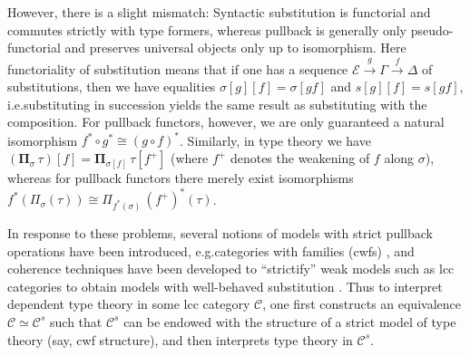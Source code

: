 \documentclass[a4paper]{article}
\theoremstyle{remark}
\theoremstyle{definition}
\begin{document}
However, there is a slight mismatch:
Syntactic substitution is functorial and commutes strictly with type formers, whereas pullback is generally only pseudo-functorial and preserves universal objects only up to isomorphism.
Here functoriality of substitution means that if one has a sequence $\mathcal{E} \xrightarrow{g} \Gamma \xrightarrow{f} \Delta$ of substitutions, then we have equalities $\sigma[g][f] = \sigma[gf]$ and $s[g][f] = s[gf]$, i.e.\@ substituting in succession yields the same result as substituting with the composition.
For pullback functors, however, we are only guaranteed a natural isomorphism $f^* \circ g^* \cong (g \circ f)^*$.
Similarly, in type theory we have $(\mathbf{\Pi}_\sigma \, \tau)[f] = \mathbf{\Pi}_{\sigma[f]} \, \tau[f^+]$ (where $f^+$ denotes the weakening of $f$ along $\sigma$), whereas for pullback functors there merely exist isomorphisms $f^*(\Pi_\sigma(\tau)) \cong \Pi_{f^*(\sigma)} \, (f^+)^*(\tau)$.

In response to these problems, several notions of models with strict pullback operations have been introduced, e.g.\@ categories with families (cwfs) \citep{internal-type-theory}, and coherence techniques have been developed to ``strictify'' weak models such as lcc categories to obtain models with well-behaved substitution \citep{substitution-up-to-isomorphism,on-the-interpretation-of-type-theory-in-lcc-categories,the-local-universes-model}.
Thus to interpret dependent type theory in some lcc category $\mathcal{C}$, one first constructs an equivalence $\mathcal{C} \simeq \mathcal{C}^s$ such that $\mathcal{C}^s$ can be endowed with the structure of a strict model of type theory (say, cwf structure), and then interprets type theory in $\mathcal{C}^s$.
\end{document}
